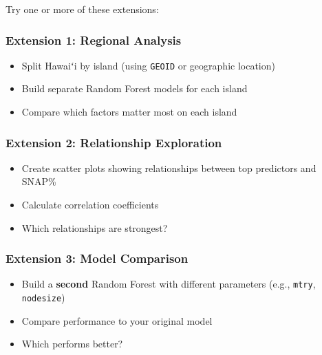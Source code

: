 \documentclass[
  letterpaper,
  DIV=11,
  numbers=noendperiod]{scrartcl}
\providecommand{\tightlist}{%
  \setlength{\itemsep}{0pt}\setlength{\parskip}{0pt}}\usepackage{longtable,booktabs,array}
\begin{document}
\begin{tcolorbox}[enhanced jigsaw, title=\textcolor{quarto-callout-tip-color}{\faLightbulb}\hspace{0.5em}{For Extra Credit}, titlerule=0mm, coltitle=black, colbacktitle=quarto-callout-tip-color!10!white, colback=white, left=2mm, toprule=.15mm, opacitybacktitle=0.6, toptitle=1mm, colframe=quarto-callout-tip-color-frame, bottomtitle=1mm, arc=.35mm, bottomrule=.15mm, breakable, leftrule=.75mm, opacityback=0, rightrule=.15mm]

Try one or more of these extensions:

\subsubsection{Extension 1: Regional
Analysis}\label{extension-1-regional-analysis}

\begin{itemize}
\tightlist
\item
  Split Hawaiʻi by island (using \texttt{GEOID} or geographic location)
\item
  Build separate Random Forest models for each island
\item
  Compare which factors matter most on each island
\end{itemize}

\subsubsection{Extension 2: Relationship
Exploration}\label{extension-2-relationship-exploration}

\begin{itemize}
\tightlist
\item
  Create scatter plots showing relationships between top predictors and
  SNAP\%
\item
  Calculate correlation coefficients
\item
  Which relationships are strongest?
\end{itemize}

\subsubsection{Extension 3: Model
Comparison}\label{extension-3-model-comparison}

\begin{itemize}
\tightlist
\item
  Build a \textbf{second} Random Forest with different parameters (e.g.,
  \texttt{mtry}, \texttt{nodesize})
\item
  Compare performance to your original model
\item
  Which performs better?
\end{itemize}


\end{tcolorbox}
\end{document}
